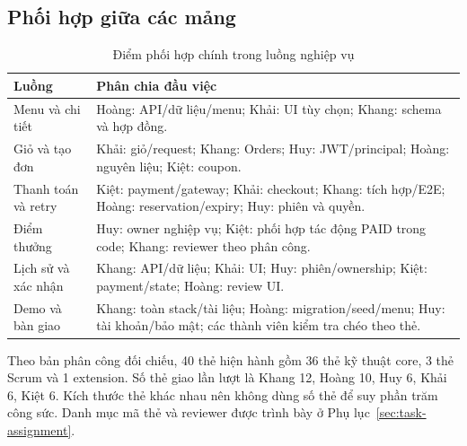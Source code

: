 \subsection{Phối hợp giữa các mảng}
\begin{table}[H]
\centering\small
\caption{Điểm phối hợp chính trong luồng nghiệp vụ}
\label{tab:collaboration}
\begin{tabularx}{\textwidth}{@{}L{0.22\textwidth}Y@{}}
\toprule\textbf{Luồng} & \textbf{Phân chia đầu việc} \\\midrule
Menu và chi tiết & Hoàng: API/dữ liệu/menu; Khải: UI tùy chọn; Khang: schema và hợp đồng. \\
Giỏ và tạo đơn & Khải: giỏ/request; Khang: Orders; Huy: JWT/principal; Hoàng: nguyên liệu; Kiệt: coupon. \\
Thanh toán và retry & Kiệt: payment/gateway; Khải: checkout; Khang: tích hợp/E2E; Hoàng: reservation/expiry; Huy: phiên và quyền. \\
Điểm thưởng & Huy: owner nghiệp vụ; Kiệt: phối hợp tác động PAID trong code; Khang: reviewer theo phân công. \\
Lịch sử và xác nhận & Khang: API/dữ liệu; Khải: UI; Huy: phiên/ownership; Kiệt: payment/state; Hoàng: review UI. \\
Demo và bàn giao & Khang: toàn stack/tài liệu; Hoàng: migration/seed/menu; Huy: tài khoản/bảo mật; các thành viên kiểm tra chéo theo thẻ. \\
\bottomrule
\end{tabularx}
\end{table}

Theo bản phân công đối chiếu, 40 thẻ hiện hành gồm 36 thẻ kỹ thuật core,
3 thẻ Scrum và 1 extension. Số thẻ giao lần lượt là Khang 12, Hoàng 10,
Huy 6, Khải 6, Kiệt 6. Kích thước thẻ khác nhau nên không dùng số thẻ để
suy phần trăm công sức. Danh mục mã thẻ và reviewer được trình bày ở
Phụ lục~\ref{sec:task-assignment}.

